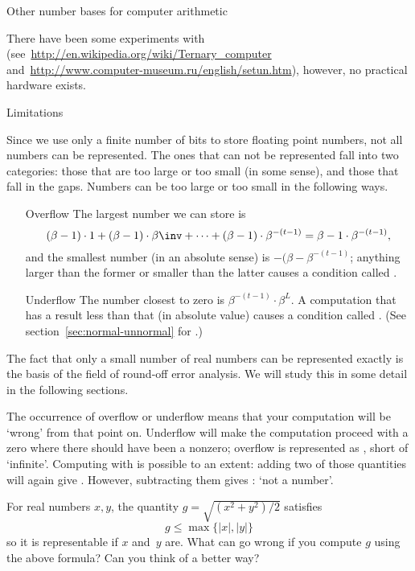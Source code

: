  {Other number bases for computer arithmetic}

There have been some experiments with 
(see~\url{http://en.wikipedia.org/wiki/Ternary_computer}
and~\url{http://www.computer-museum.ru/english/setun.htm}), however,
no practical hardware exists.


 {Limitations}
\label{sec:exceptions}

Since we use only a finite number of bits to store floating point
numbers, not all numbers can be represented. The ones that can not be
represented fall into two categories: those that are too large or too
small (in some sense), and those that fall in the gaps. Numbers can be
too large or too small in the following ways.
\begin{itemize}
\item[Overflow] The largest number we can store is
  \[ (\beta-1)\cdot1+(\beta-1)\cdot\beta\inv+\cdots
  +(\beta-1)\cdot\beta^{-(t-1)}=\beta-1\cdot\beta^{-(t-1)},
  \]
  and the smallest number (in an absolute
  sense) is $-(\beta-\beta^{-(t-1)}$; anything larger than the
  former or smaller than the latter causes a condition called
  .
\item[Underflow]The number closest to zero is $\beta^{-(t-1)}\cdot
  \beta^L$. A computation that has a result less than that (in
  absolute value) causes a condition called . 
  (See section~\ref{sec:normal-unnormal} 
  for .)
\end{itemize}
The fact that only a small number of real numbers can be represented
exactly is the basis of the field of round-off error analysis. We will
study this in some detail in the following sections.

The occurrence of overflow or underflow means that your computation
will be `wrong' from that point on. Underflow will make the computation
proceed with a zero where there should have been a nonzero;
overflow is represented as , short of `infinite'.
Computing with  is possible to an extent: adding two of those
quantities will again give . However, subtracting them gives
: `not a number'.

\begin{exercise}
For real numbers $x,y$, the quantity $g=\sqrt{(x^2+y^2)/2}$ satisfies
\[ g\leq \max\{|x|,|y|\} \]
so it is representable if $x$ and~$y$ are.
What can go wrong if you compute $g$ using the above formula?
Can you think of a better way?
\end{exercise}


